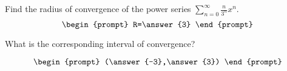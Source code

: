 \documentclass{ximera}
\author{Gregory Hartman \and Matthew Carr}
\begin{document}
\begin{exercise}




Find the radius of convergence of the power series $\sum_{n=0}^{\infty}\frac{n}{3^n}x^n$.
\[
\begin{prompt}
R=\answer{3}
\end{prompt}
\]

What is the corresponding interval of convergence?

\[
\begin{prompt}
(\answer{-3},\answer{3})
\end{prompt}
\]

\end{exercise}
\end{document}
